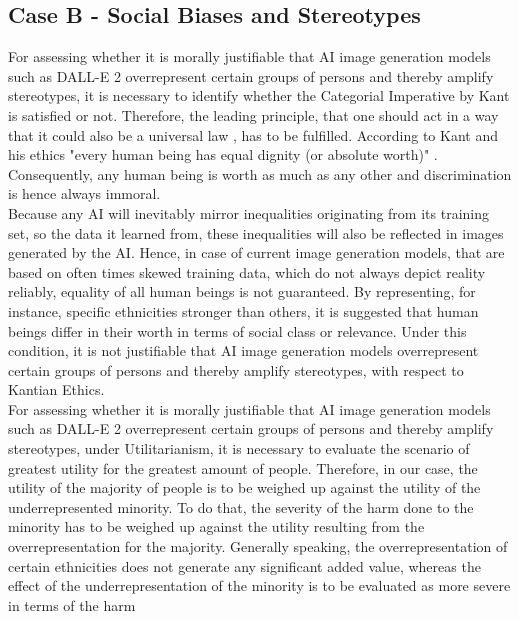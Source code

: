 \documentclass[10pt,twocolumn,twoside]{osajnl}
\begin{document}
\subsection{Case B - Social Biases and Stereotypes}
For assessing whether it is morally justifiable that AI image generation models such as DALL-E 2 overrepresent certain groups of persons and thereby amplify stereotypes, it is necessary to 
identify whether the Categorial Imperative by Kant is satisfied or not. Therefore, the leading principle, that one should act in a way that it could also be a universal law \cite{kant}, has to be fulfilled. 
According to Kant and his ethics "every human being has equal dignity (or absolute worth)" \cite{kant}. Consequently, any human being is worth as much as any other and discrimination is hence always immoral. 
\\
Because any AI will inevitably mirror inequalities originating from its training set, so the data it learned from, these inequalities will also be reflected in images generated by the AI. 
Hence, in case of current image generation models, that are based on often times skewed training data, which do not always depict reality reliably, equality of all human beings is not guaranteed.
By representing, for instance, specific ethnicities stronger than others, it is suggested that human beings differ in their worth in terms of social class or relevance. 
Under this condition, it is not justifiable that AI image generation models overrepresent certain groups of persons and thereby amplify stereotypes, with respect to Kantian Ethics.
\\
For assessing whether it is morally justifiable that AI image generation models such as DALL-E 2 overrepresent certain groups of persons and thereby amplify stereotypes, under Utilitarianism,
it is necessary to evaluate the scenario of greatest utility for the greatest amount of people. Therefore, in our case, the utility of the majority of people is to be weighed up against the utility of the underrepresented 
minority. To do that, the severity of the harm done to the minority has to be weighed up against the utility resulting from the overrepresentation for the majority. Generally speaking, 
the overrepresentation of certain ethnicities does not generate any significant added value, whereas the effect of the underrepresentation of the minority is to be evaluated as more severe in terms of the harm 
\end{document}
